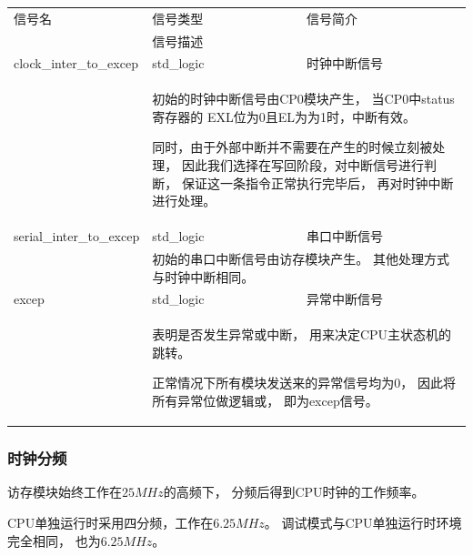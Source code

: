             \begin{tabularx}{\textwidth}{lll}
                \toprule
                信号名          & 信号类型  & 信号简介 \\
                \cmidrule(l){2-3}
                &
                \multicolumn{2}{X}{信号描述} \\
                \midrule
                clock\_inter\_to\_excep   & std\_logic    & 时钟中断信号 \\
                \cmidrule(l){2-3}
                &
                \multicolumn{2}{X}{
                    初始的时钟中断信号由CP0模块产生，%
                    当CP0中status寄存器的%
                    EXL位为0且EL为为1时，中断有效。

                    同时，由于外部中断并不需要在产生的时候立刻被处理，%
                    因此我们选择在写回阶段，对中断信号进行判断，%
                    保证这一条指令正常执行完毕后，%
                    再对时钟中断进行处理。
                } \\
                \midrule
                serial\_inter\_to\_excep   & std\_logic    & 串口中断信号 \\
                \cmidrule(l){2-3}
                &
                \multicolumn{2}{X}{
                    初始的串口中断信号由访存模块产生。%
                    其他处理方式与时钟中断相同。
                } \\
                \midrule
                excep   & std\_logic    & 异常中断信号 \\
                \cmidrule(l){2-3}
                &
                \multicolumn{2}{X}{
                    表明是否发生异常或中断，%
                    用来决定CPU主状态机的跳转。%

                    正常情况下所有模块发送来的异常信号均为0，%
                    因此将所有异常位做逻辑或，%
                    即为excep信号。
                } \\
                \bottomrule
            \end{tabularx}

        \subsubsection{时钟分频}
            访存模块始终工作在$25MHz$的高频下，
            分频后得到CPU时钟的工作频率。
    
            CPU单独运行时采用四分频，工作在$6.25MHz$。
            调试模式与CPU单独运行时环境完全相同，
            也为$6.25MHz$。
